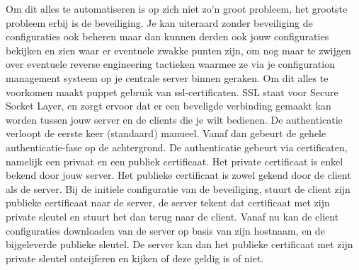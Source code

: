 Om dit alles te automatiseren is op zich niet zo'n groot probleem, het grootste probleem erbij is de beveiliging. Je kan uiteraard zonder beveiliging de configuraties ook beheren maar dan kunnen derden ook jouw configuraties bekijken en zien waar er eventuele zwakke punten zijn, om nog maar te zwijgen over eventuele reverse engineering tactieken waarmee ze via je configuration management systeem op je centrale server binnen geraken. Om dit alles te voorkomen maakt puppet gebruik van ssl-certificaten. SSL staat voor Secure Socket Layer, en zorgt ervoor dat er een beveligde verbinding gemaakt kan worden tussen jouw server en de clients die je wilt bedienen. De authenticatie verloopt de eerste keer (standaard) manueel. Vanaf dan gebeurt de gehele authenticatie-fase op de achtergrond. De authenticatie gebeurt via certificaten, namelijk een privaat en een publiek certificaat. Het private certificaat is enkel bekend door jouw server. Het publieke certificaat is zowel gekend door de client als de server. Bij de initiele configuratie van de beveiliging, stuurt de client zijn publieke certificaat naar de server, de server tekent dat certificaat met zijn private sleutel en stuurt het dan terug naar de client. Vanaf nu kan de client configuraties downloaden van de server op basis van zijn hostnaam, en de bijgeleverde publieke sleutel. De server kan dan het publieke certificaat met zijn private sleutel ontcijferen en kijken of deze geldig is of niet.
